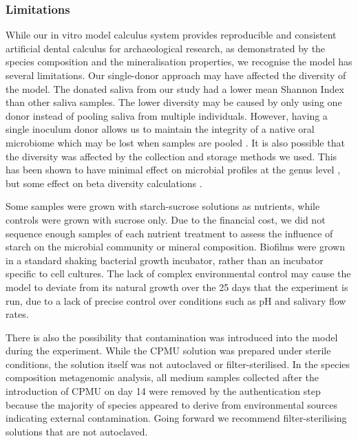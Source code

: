 \documentclass[10pt,a4paper]{article}
\begin{document}
\subsubsection{Limitations}\label{limitations}

While our in vitro model calculus system provides reproducible and
consistent artificial dental calculus for archaeological research, as
demonstrated by the species composition and the mineralisation
properties, we recognise the model has several limitations. Our
single-donor approach may have affected the diversity of the model. The
donated saliva from our study had a lower mean Shannon Index than other
saliva samples. The lower diversity may be caused by only using one
donor instead of pooling saliva from multiple individuals. However,
having a single inoculum donor allows us to maintain the integrity of a
native oral microbiome which may be lost when samples are pooled
\citep{edlundBiofilmModel2013}. It is also possible that the diversity
was affected by the collection and storage methods we used. This has
been shown to have minimal effect on microbial profiles at the genus
level \citep{limSalivaMicrobiome2017}, but some effect on beta diversity
calculations \citep{omoriComparativeEvaluation2021}.

Some samples were grown with starch-sucrose solutions as nutrients,
while controls were grown with sucrose only. Due to the financial cost,
we did not sequence enough samples of each nutrient treatment to assess
the influence of starch on the microbial community or mineral
composition. Biofilms were grown in a standard shaking bacterial growth
incubator, rather than an incubator specific to cell cultures. The lack
of complex environmental control may cause the model to deviate from its
natural growth over the 25 days that the experiment is run, due to a
lack of precise control over conditions such as pH and salivary flow
rates.

There is also the possibility that contamination was introduced into the
model during the experiment. While the CPMU solution was prepared under
sterile conditions, the solution itself was not autoclaved or
filter-sterilised. In the species composition metagenomic analysis, all
medium samples collected after the introduction of CPMU on day 14 were
removed by the authentication step because the majority of species
appeared to derive from environmental sources indicating external
contamination. Going forward we recommend filter-sterilising solutions
that are not autoclaved.
\end{document}
